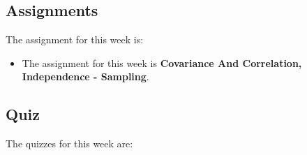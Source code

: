 \subsection{Assignments}

The assignment for this week is:

\begin{itemize}
    \item The assignment for this week is \textbf{Covariance And Correlation, Independence - Sampling}. 
\end{itemize}

\subsection{Quiz}

The quizzes for this week are:

\begin{itemize}
     \textbullet {} 
\end{itemize}